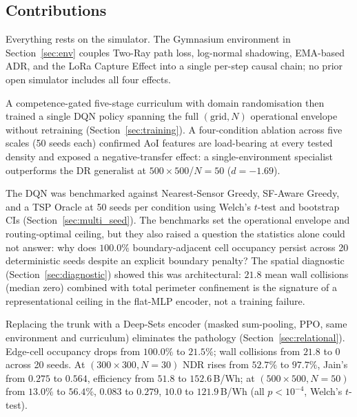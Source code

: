 \subsection{Contributions}
\label{sec:contributions}

Everything rests on the simulator. The Gymnasium environment in Section~\ref{sec:env} couples Two-Ray path loss, log-normal shadowing, EMA-based ADR, and the LoRa Capture Effect into a single per-step causal chain; no prior open simulator includes all four effects.

A competence-gated five-stage curriculum with domain randomisation then trained a single DQN policy spanning the full $(\text{grid}, N)$ operational envelope without retraining (Section~\ref{sec:training}). A four-condition ablation across five scales (50 seeds each) confirmed AoI features are load-bearing at every tested density and exposed a negative-transfer effect: a single-environment specialist outperforms the DR generalist at $500{\times}500$/$N{=}50$ ($d{=}-1.69$).

The DQN was benchmarked against Nearest-Sensor Greedy, SF-Aware Greedy, and a TSP Oracle at 50 seeds per condition using Welch's $t$-test and bootstrap CIs (Section~\ref{sec:multi_seed}). The benchmarks set the operational envelope and routing-optimal ceiling, but they also raised a question the statistics alone could not answer: why does $100.0\%$ boundary-adjacent cell occupancy persist across 20 deterministic seeds despite an explicit boundary penalty? The spatial diagnostic (Section~\ref{sec:diagnostic}) showed this was architectural: $21.8$ mean wall collisions (median zero) combined with total perimeter confinement is the signature of a representational ceiling in the flat-MLP encoder, not a training failure.

Replacing the trunk with a Deep-Sets encoder (masked sum-pooling, PPO, same environment and curriculum) eliminates the pathology (Section~\ref{sec:relational}). Edge-cell occupancy drops from $100.0\%$ to $21.5\%$; wall collisions from $21.8$ to $0$ across 20 seeds. At $(300{\times}300, N{=}30)$ NDR rises from $52.7\%$ to $97.7\%$, Jain's from $0.275$ to $0.564$, efficiency from $51.8$ to $152.6$\,B/Wh; at $(500{\times}500, N{=}50)$ from $13.0\%$ to $56.4\%$, $0.083$ to $0.279$, $10.0$ to $121.9$\,B/Wh (all $p < 10^{-4}$, Welch's $t$-test).
